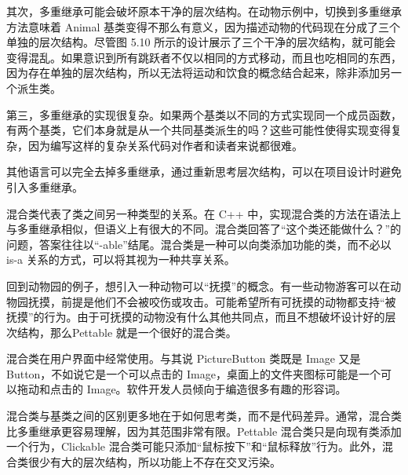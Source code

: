 其次，多重继承可能会破坏原本干净的层次结构。在动物示例中，切换到多重继承方法意味着 Animal 基类变得不那么有意义，因为描述动物的代码现在分成了三个单独的层次结构。尽管图 5.10 所示的设计展示了三个干净的层次结构，就可能会变得混乱。如果意识到所有跳跃者不仅以相同的方式移动，而且也吃相同的东西，因为存在单独的层次结构，所以无法将运动和饮食的概念结合起来，除非添加另一个派生类。

第三，多重继承的实现很复杂。如果两个基类以不同的方式实现同一个成员函数，有两个基类，它们本身就是从一个共同基类派生的吗？这些可能性使得实现变得复杂，因为编写这样的复杂关系代码对作者和读者来说都很难。

其他语言可以完全去掉多重继承，通过重新思考层次结构，可以在项目设计时避免引入多重继承。


混合类代表了类之间另一种类型的关系。在 C++ 中，实现混合类的方法在语法上与多重继承相似，但语义上有很大的不同。混合类回答了“这个类还能做什么？”的问题，答案往往以“-able”结尾。混合类是一种可以向类添加功能的类，而不必以 is-a 关系的方式，可以将其视为一种共享关系。

回到动物园的例子，想引入一种动物可以“抚摸”的概念。有一些动物游客可以在动物园抚摸，前提是他们不会被咬伤或攻击。可能希望所有可抚摸的动物都支持“被抚摸”的行为。由于可抚摸的动物没有什么其他共同点，而且不想破坏设计好的层次结构，那么Pettable 就是一个很好的混合类。

混合类在用户界面中经常使用。与其说 PictureButton 类既是 Image 又是 Button，不如说它是一个可以点击的 Image，桌面上的文件夹图标可能是一个可以拖动和点击的 Image。软件开发人员倾向于编造很多有趣的形容词。

混合类与基类之间的区别更多地在于如何思考类，而不是代码差异。通常，混合类比多重继承更容易理解，因为其范围非常有限。Pettable 混合类只是向现有类添加一个行为，Clickable 混合类可能只添加“鼠标按下”和“鼠标释放”行为。此外，混合类很少有大的层次结构，所以功能上不存在交叉污染。





























